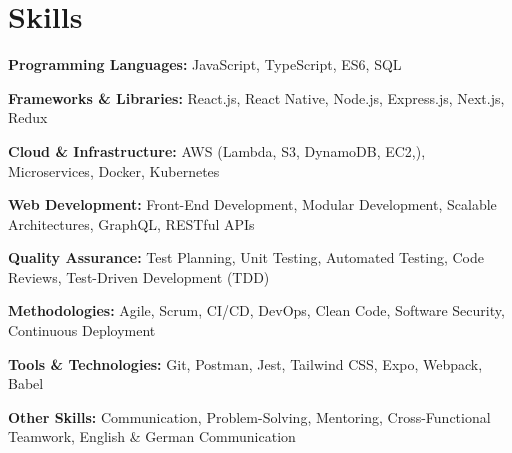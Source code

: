 \section{Skills}
\vspace{2pt}
\resumeSubHeadingListStart
\small{\item{

                  \textbf{Programming Languages:} JavaScript, TypeScript, ES6, SQL \\ \vspace{3pt}

                  \textbf{Frameworks \& Libraries:} React.js, React Native, Node.js, Express.js, Next.js, Redux \\ \vspace{3pt}

                  \textbf{Cloud \& Infrastructure:} AWS (Lambda, S3, DynamoDB, EC2,), Microservices, Docker, Kubernetes \\ \vspace{3pt}

                  \textbf{Web Development:} Front-End Development, Modular Development, Scalable Architectures, GraphQL, RESTful APIs \\ \vspace{3pt}

                  \textbf{Quality Assurance:} Test Planning, Unit Testing, Automated Testing, Code Reviews, Test-Driven Development (TDD) \\ \vspace{3pt}

                  \textbf{Methodologies:} Agile, Scrum, CI/CD, DevOps, Clean Code, Software Security, Continuous Deployment \\ \vspace{3pt}

                  \textbf{Tools \& Technologies:} Git, Postman, Jest, Tailwind CSS, Expo, Webpack, Babel \\ \vspace{3pt}

                  \textbf{Other Skills:} Communication, Problem-Solving, Mentoring, Cross-Functional Teamwork, English \& German Communication
            }}
\resumeSubHeadingListEnd
